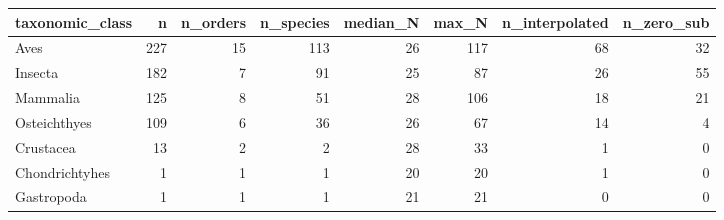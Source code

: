 \begin{table}[ht]
\centering
\begin{tabular}{lrrrrrrr}
  \hline
taxonomic\_class & n & n\_orders & n\_species & median\_N & max\_N & n\_interpolated & n\_zero\_sub \\ 
  \hline
Aves & 227 &  15 & 113 &  26 & 117 &  68 &  32 \\ 
  Insecta & 182 &   7 &  91 &  25 &  87 &  26 &  55 \\ 
  Mammalia & 125 &   8 &  51 &  28 & 106 &  18 &  21 \\ 
  Osteichthyes & 109 &   6 &  36 &  26 &  67 &  14 &   4 \\ 
  Crustacea &  13 &   2 &   2 &  28 &  33 &   1 &   0 \\ 
  Chondrichtyhes &   1 &   1 &   1 &  20 &  20 &   1 &   0 \\ 
  Gastropoda &   1 &   1 &   1 &  21 &  21 &   0 &   0 \\ 
   \hline
\end{tabular}
\end{table}
